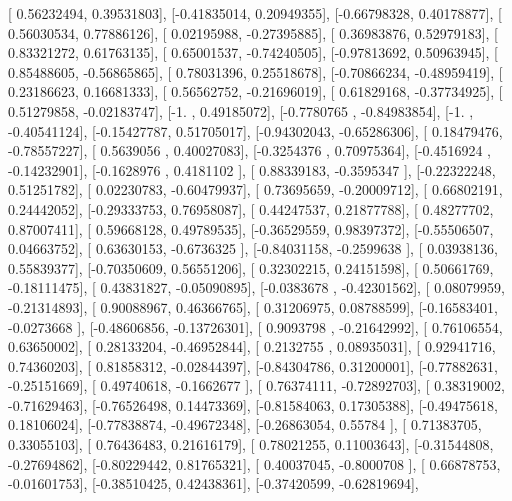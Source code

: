 \documentclass{article}
\begin{document}
       [ 0.56232494,  0.39531803],
       [-0.41835014,  0.20949355],
       [-0.66798328,  0.40178877],
       [ 0.56030534,  0.77886126],
       [ 0.02195988, -0.27395885],
       [ 0.36983876,  0.52979183],
       [ 0.83321272,  0.61763135],
       [ 0.65001537, -0.74240505],
       [-0.97813692,  0.50963945],
       [ 0.85488605, -0.56865865],
       [ 0.78031396,  0.25518678],
       [-0.70866234, -0.48959419],
       [ 0.23186623,  0.16681333],
       [ 0.56562752, -0.21696019],
       [ 0.61829168, -0.37734925],
       [ 0.51279858, -0.02183747],
       [-1.        ,  0.49185072],
       [-0.7780765 , -0.84983854],
       [-1.        , -0.40541124],
       [-0.15427787,  0.51705017],
       [-0.94302043, -0.65286306],
       [ 0.18479476, -0.78557227],
       [ 0.5639056 ,  0.40027083],
       [-0.3254376 ,  0.70975364],
       [-0.4516924 , -0.14232901],
       [-0.1628976 ,  0.4181102 ],
       [ 0.88339183, -0.3595347 ],
       [-0.22322248,  0.51251782],
       [ 0.02230783, -0.60479937],
       [ 0.73695659, -0.20009712],
       [ 0.66802191,  0.24442052],
       [-0.29333753,  0.76958087],
       [ 0.44247537,  0.21877788],
       [ 0.48277702,  0.87007411],
       [ 0.59668128,  0.49789535],
       [-0.36529559,  0.98397372],
       [-0.55506507,  0.04663752],
       [ 0.63630153, -0.6736325 ],
       [-0.84031158, -0.2599638 ],
       [ 0.03938136,  0.55839377],
       [-0.70350609,  0.56551206],
       [ 0.32302215,  0.24151598],
       [ 0.50661769, -0.18111475],
       [ 0.43831827, -0.05090895],
       [-0.0383678 , -0.42301562],
       [ 0.08079959, -0.21314893],
       [ 0.90088967,  0.46366765],
       [ 0.31206975,  0.08788599],
       [-0.16583401, -0.0273668 ],
       [-0.48606856, -0.13726301],
       [ 0.9093798 , -0.21642992],
       [ 0.76106554,  0.63650002],
       [ 0.28133204, -0.46952844],
       [ 0.2132755 ,  0.08935031],
       [ 0.92941716,  0.74360203],
       [ 0.81858312, -0.02844397],
       [-0.84304786,  0.31200001],
       [-0.77882631, -0.25151669],
       [ 0.49740618, -0.1662677 ],
       [ 0.76374111, -0.72892703],
       [ 0.38319002, -0.71629463],
       [-0.76526498,  0.14473369],
       [-0.81584063,  0.17305388],
       [-0.49475618,  0.18106024],
       [-0.77838874, -0.49672348],
       [-0.26863054,  0.55784   ],
       [ 0.71383705,  0.33055103],
       [ 0.76436483,  0.21616179],
       [ 0.78021255,  0.11003643],
       [-0.31544808, -0.27694862],
       [-0.80229442,  0.81765321],
       [ 0.40037045, -0.8000708 ],
       [ 0.66878753, -0.01601753],
       [-0.38510425,  0.42438361],
       [-0.37420599, -0.62819694],
\end{document}
